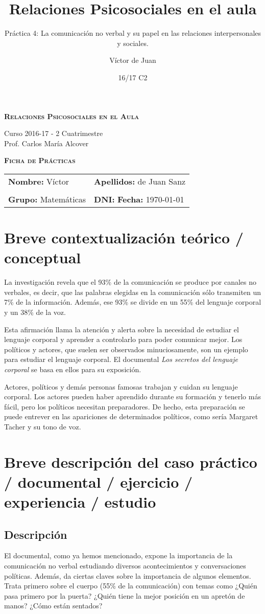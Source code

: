 \documentclass[palatino,nochap]{apuntesURJC}
\title{Relaciones Psicosociales en el aula}
\subtitle{Práctica 4: La comunicación no verbal y su papel en las relaciones interpersonales y sociales.}
\author{Víctor de Juan}
\date{16/17 C2}
\newcommand{\makeheader}[1]{
\begin{center}
\Large \textbf{\textsc{Relaciones Psicosociales en el Aula}}\\
\end{center}
\begin{center}
\large Curso 2016-17 - 2 Cuatrimestre\\
Prof. Carlos María Alcover
\end{center}

\begin{center}
\Large \textbf{\textsc{Ficha de Prácticas}}
\end{center}

\begin{center}
\begin{tabular}{ll}
\hspace{2cm}\textbf{Nombre:} Víctor &  \hspace{1.5cm} \textbf{Apellidos:} de Juan Sanz\\
\vspace{0.3cm}&\\
\textbf{Grupo:} Matemáticas 	& \textbf{DNI:} %
 \hspace{3cm} \textbf{Fecha:} #1
\end{tabular}
\end{center}
}
\begin{document}
\pagestyle{plain}
\maketitle

\makeheader{\today}

\section{Breve contextualización teórico / conceptual}
\label{intro}

La investigación revela que el 93\% de la comunicación se produce por canales no verbales, es decir, que las palabras elegidas en la comunicación sólo transmiten un 7\% de la información.
%
Además, ese 93\% se divide en un 55\% del lenguaje corporal y un 38\% de la voz.

Esta afirmación llama la atención y alerta sobre la necesidad de estudiar el lenguaje corporal y aprender a controlarlo para poder comunicar mejor.
%
Los políticos y actores, que suelen ser observados minuciosamente, son un ejemplo para estudiar el lenguaje corporal. 
%
El documental \textit{Los secretos del lenguaje corporal} se basa en ellos para su exposición.

Actores, políticos y demás personas famosas trabajan y cuidan su lenguaje corporal. 
%
Los actores pueden haber aprendido durante su formación y tenerlo más fácil, pero los políticos necesitan preparadores. 
%
De hecho, esta preparación se puede entrever en las apariciones de determinados políticos, como sería Margaret Tacher y su tono de voz.

\section{Breve descripción del caso práctico / documental / ejercicio / experiencia / estudio}

\subsection{Descripción}

El documental, como ya hemos mencionado, expone la importancia de la comunicación no verbal estudiando diversos acontecimientos y conversaciones políticas.
%
Además, da ciertas claves sobre la importancia de algunos elementos.
%
Trata primero sobre el cuerpo (55\% de la comunicación) con temas como ¿Quién pasa primero por la puerta? ¿Quién tiene la mejor posición en un apretón de manos? ¿Cómo están sentados?
\end{document}
